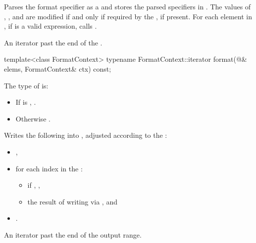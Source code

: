 \begin{itemdescr}
\pnum
\effects
Parses the format specifier as a  and
stores the parsed specifiers in .
The values of
,
, and
are modified if and only if
required by the , if present.
For each element  in ,
if  is a valid expression,
calls .

\pnum
\returns
An iterator past the end of the .
\end{itemdescr}

%
\begin{itemdecl}
template<class FormatContext>
  typename FormatContext::iterator
    format(@\seebelow@& elems, FormatContext& ctx) const;
\end{itemdecl}

\begin{itemdescr}
\pnum
The type of  is:
\begin{itemize}
\item
If  is ,
.
\item
Otherwise .
\end{itemize}

\pnum
\effects
Writes the following into ,
adjusted according to the :
\begin{itemize}
\item
{},
\item
for each index  in the :
\begin{itemize}
\item
if , ,
\item
the result of writing 
via , and
\end{itemize}
\item
{}.
\end{itemize}

\pnum
\returns
An iterator past the end of the output range.
\end{itemdescr}

